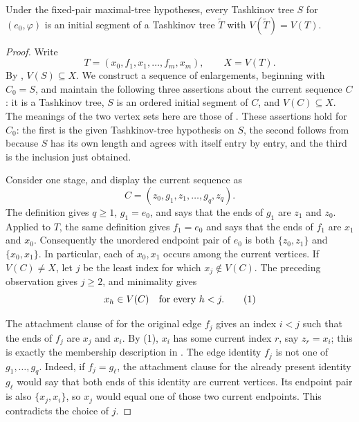 \begin{lemma}
Under the fixed-pair maximal-tree hypotheses, every Tashkinov tree $S$ for
$(e_0,\varphi)$ is an initial segment of a Tashkinov tree $\widetilde T$
with $V(\widetilde T)=V(T)$.
\end{lemma}
\begin{proof}
Write
\[
 T=(x_0,f_1,x_1,\ldots,f_m,x_m),\qquad X=V(T).
\]
By , $V(S)\subseteq X$.  We
construct a sequence of enlargements, beginning with $C_0=S$, and maintain
the following three assertions about the current sequence $C$: it is a
Tashkinov tree, $S$ is an ordered initial segment of $C$, and
$V(C)\subseteq X$.  The meanings of the two vertex sets here are those of
.  These assertions hold for $C_0$: the
first is the given Tashkinov-tree hypothesis on $S$, the second follows
from  because $S$ has its own length
and agrees with itself entry by entry, and the third is the inclusion just
obtained.

Consider one stage, and display the current sequence as
\[
 C=(z_0,g_1,z_1,\ldots,g_q,z_q).
\]
The definition  gives $q\geq1$, $g_1=e_0$, and says
that the ends of $g_1$ are $z_1$ and $z_0$.  Applied to $T$, the same
definition gives $f_1=e_0$ and says that the ends of $f_1$ are $x_1$ and
$x_0$.  Consequently the unordered endpoint pair of $e_0$ is both
$\{z_0,z_1\}$ and $\{x_0,x_1\}$.  In particular, each of $x_0,x_1$ occurs
among the current vertices.  If $V(C)\ne X$, let $j$ be the least index for
which $x_j\notin V(C)$.  The preceding observation gives $j\geq2$, and
minimality gives
\[
 x_h\in V(C)\quad\hbox{for every }h<j. \tag{1}
\]

The attachment clause of  for the original edge
$f_j$ gives an index $i<j$ such that the ends of $f_j$ are $x_j$ and
$x_i$.  By (1), $x_i$ has some current index $r$, say $z_r=x_i$; this is
exactly the membership description in .
The edge identity $f_j$ is not one of $g_1,\ldots,g_q$.  Indeed, if
$f_j=g_\ell$, the attachment clause for the already present identity
$g_\ell$ would say that both ends of this identity are current vertices.
Its endpoint pair is also $\{x_j,x_i\}$, so $x_j$ would equal one of those
two current endpoints.  This contradicts the choice of $j$.


\end{proof}
